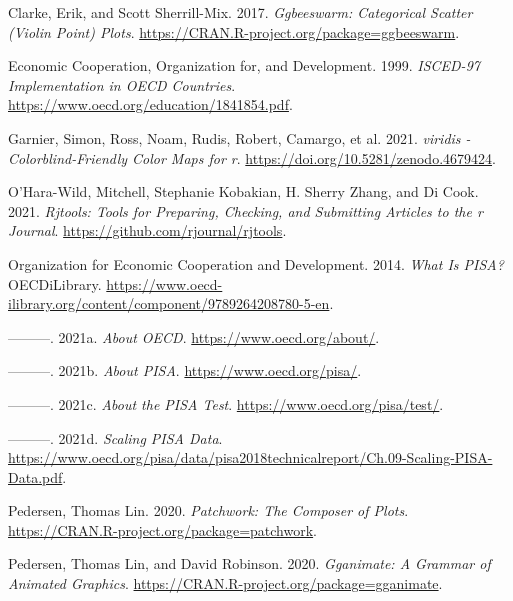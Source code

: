 \hypertarget{refs}{}
\begin{CSLReferences}{1}{0}
\leavevmode{}%
Clarke, Erik, and Scott Sherrill-Mix. 2017. \emph{Ggbeeswarm: Categorical Scatter (Violin Point) Plots}. \url{https://CRAN.R-project.org/package=ggbeeswarm}.

\leavevmode{}%
Economic Cooperation, Organization for, and Development. 1999. \emph{ISCED-97 Implementation in OECD Countries}. \url{https://www.oecd.org/education/1841854.pdf}.

\leavevmode{}%
Garnier, Simon, Ross, Noam, Rudis, Robert, Camargo, et al. 2021. \emph{{viridis} - Colorblind-Friendly Color Maps for r}. \url{https://doi.org/10.5281/zenodo.4679424}.

\leavevmode{}%
O'Hara-Wild, Mitchell, Stephanie Kobakian, H. Sherry Zhang, and Di Cook. 2021. \emph{Rjtools: Tools for Preparing, Checking, and Submitting Articles to the r Journal}. \url{https://github.com/rjournal/rjtools}.

\leavevmode{}%
Organization for Economic Cooperation and Development. 2014. \emph{What Is PISA?} OECDiLibrary. \url{https://www.oecd-ilibrary.org/content/component/9789264208780-5-en}.

\leavevmode{}%
---------. 2021a. \emph{About OECD}. \url{https://www.oecd.org/about/}.

\leavevmode{}%
---------. 2021b. \emph{About PISA}. \url{https://www.oecd.org/pisa/}.

\leavevmode{}%
---------. 2021c. \emph{About the PISA Test}. \url{https://www.oecd.org/pisa/test/}.

\leavevmode{}%
---------. 2021d. \emph{Scaling PISA Data}. \url{https://www.oecd.org/pisa/data/pisa2018technicalreport/Ch.09-Scaling-PISA-Data.pdf}.

\leavevmode{}%
Pedersen, Thomas Lin. 2020. \emph{Patchwork: The Composer of Plots}. \url{https://CRAN.R-project.org/package=patchwork}.

\leavevmode{}%
Pedersen, Thomas Lin, and David Robinson. 2020. \emph{Gganimate: A Grammar of Animated Graphics}. \url{https://CRAN.R-project.org/package=gganimate}.


\end{CSLReferences}
